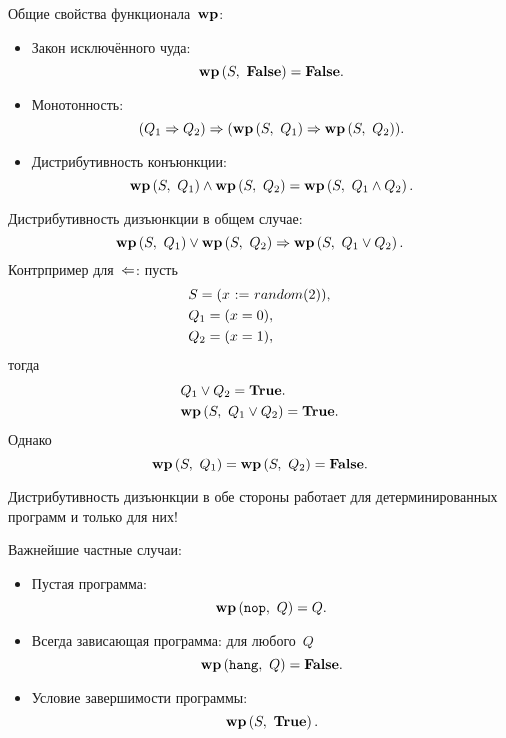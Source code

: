 \documentclass[landscape]{slides}
\begin{document}
\begin{slide}
        Общие свойства функционала~$\mathbf{wp}$:

        \begin{itemize}
                \item Закон исключённого чуда:
                        \[
                                \mathbf{wp}\left({S},\ {\mathbf{False}}\right) = \mathbf{False} .
                        \]
                \item Монотонность:
                        \[
                                (Q_1\Rightarrow Q_2)
                                \Rightarrow
                                (\mathbf{wp}\left({S},\ {Q_1}\right) \Rightarrow \mathbf{wp}\left({S},\ {Q_2}\right)) .
                        \]
                \item Дистрибутивность конъюнкции:
                        \[
                                \mathbf{wp}\left({S},\ {Q_1}\right) \land \mathbf{wp}\left({S},\ {Q_2}\right) = \mathbf{wp}\left({S},\ {Q_1 \land Q_2}\right) .
                        \]
        \end{itemize}
\end{slide}

\begin{slide}
        Дистрибутивность дизъюнкции в общем случае:
        \[
                \mathbf{wp}\left({S},\ {Q_1}\right) \lor \mathbf{wp}\left({S},\ {Q_2}\right) \Rightarrow \mathbf{wp}\left({S},\ {Q_1 \lor Q_2}\right) .
        \]
        Контрпример для~$\Leftarrow$: пусть
        \begin{eqnarray*}
                &S = (x \ \mathtt{:=}\  random(2)),\\
                &Q_1 = (x = 0),\\
                &Q_2 = (x = 1),
        \end{eqnarray*}
        тогда
        \begin{eqnarray*}
                &Q_1 \lor Q_2 = \mathbf{True}.\\
                &\mathbf{wp}\left({S},\ {Q_1 \lor Q_2}\right) = \mathbf{True} .
        \end{eqnarray*}
        Однако
        \[
                \mathbf{wp}\left({S},\ {Q_1}\right) = \mathbf{wp}\left({S},\ {Q_2}\right) = \mathbf{False} .
        \]

        Дистрибутивность дизъюнкции в обе стороны работает для детерминированных программ и только для них!
\end{slide}

\begin{slide}
        Важнейшие частные случаи:

        \begin{itemize}
                \item Пустая программа:
                        \[
                                \mathbf{wp}\left({\mathtt{nop}},\ {Q}\right) = Q .
                        \]
                \item Всегда зависающая программа: для любого~$Q$
                        \[
                                \mathbf{wp}\left({\mathtt{hang}},\ {Q}\right) = \mathbf{False} .
                        \]
                \item Условие завершимости программы:
                        \[
                                \mathbf{wp}\left({S},\ {\mathbf{True}}\right) .
                        \]
        \end{itemize}
\end{slide}
\end{document}
